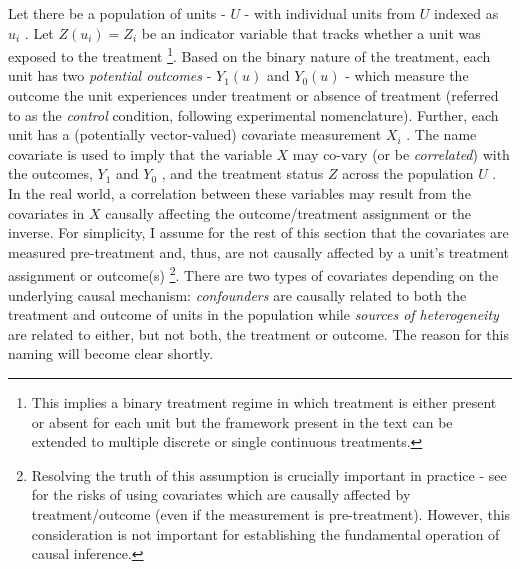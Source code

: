 \documentclass[../main.tex]{subfiles}
\begin{document}
\vspace{\baselineskip}
Let there be a population of units -  \( U \) - with individual units from  \( U \)  indexed as  \( u_{i} \) . Let  \( Z \left( u_{i} \right)  = Z_{i} \) be an indicator variable that tracks whether a unit was exposed to the treatment \footnote{ This implies a binary treatment regime in which treatment is either present or absent for each unit but the framework present in the text can be extended to multiple discrete or single continuous treatments. }. Based on the binary nature of the treatment, each unit has two \textit{potential outcomes }-  \( Y_{1} \left( u \right)  \) and  \( Y_{0} \left( u \right)  \)  - which measure the outcome the unit experiences under treatment or absence of treatment (referred to as the \textit{control }condition, following experimental nomenclature). Further, each unit has a (potentially vector-valued) covariate measurement  \( X_{i} \) . The name covariate is used to imply that the variable  \( X \) may co-vary (or be \textit{correlated}) with the outcomes,  \( Y_{1} \) and  \( Y_{0} \) , and the treatment status  \( Z \) across the population \( U \) . In the real world, a correlation between these variables may result from the covariates in  \( X \) causally affecting the outcome/treatment assignment or the inverse. For simplicity, I assume for the rest of this section that the covariates are measured pre-treatment and, thus, are not causally affected by a unit’s treatment assignment or outcome(s) \footnote{ Resolving the truth of this assumption is crucially important in practice - see \textcite{Pearl2009CausalOverview} for the risks of using covariates which are causally affected by treatment/outcome (even if the measurement is pre-treatment). However, this consideration is not important for establishing the fundamental operation of causal inference. }. There are two types of covariates depending on the underlying causal mechanism: \textit{confounders} are causally related to both the treatment and outcome of units in the population while \textit{sources of heterogeneity }are related to either, but not both, the treatment or outcome. The reason for this naming will become clear shortly.\par
\end{document}
